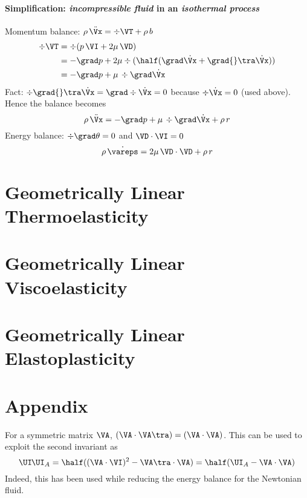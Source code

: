 \documentclass[a5paper,twosided,11pt,DIV=15,BCOR=0mm]{scrbook}
\newcommand{\veps}{\vareps}
\newcommand{\rtwo}{\UI\hspace{-0.07em}\UI}
\begin{document}
\subsubsection{Simplification: \emph{incompressible fluid} in an
  \emph{isothermal process}}
Momentum balance: $\rho\,\ddot{\Vx} = \div\VT + \rho\,b$
\begin{align}
\nonumber  \div\VT &= \div(p\,\VI + 2\mu\,\VD) \\
  &= -\grad p + 2\mu\div(\half(\grad\dot{\Vx}+\grad{}\tra\dot{\Vx}))\\
  &= -\grad p + \mu\,\div\grad\dot{\Vx}
\end{align}
Fact: $\div\grad{}\tra\dot{\Vx}=\grad\div\dot{\Vx} = 0$ because
$\div\dot{\Vx}=0$ (used above). Hence the balance becomes
%
\begin{equation}
  \rho\,\ddot{\Vx} = -\grad p + \mu\,\div\grad\dot{\Vx} + \rho\,r
\end{equation}
Energy balance: $\div\grad\theta=0$ and $\VD\cdot\VI=0$
\begin{equation}
  \rho\,\dot{\veps} = 2\mu\,\VD\cdot\VD+\rho\,r
\end{equation}
\chapter{Geometrically Linear Thermoelasticity}
%
%
\chapter{Geometrically Linear Viscoelasticity}
%
\chapter{Geometrically Linear Elastoplasticity}
%
\chapter{Appendix}
For a symmetric matrix $\VA$, $(\VA\cdot\VA\tra)=(\VA\cdot\VA)$. This can be used to
exploit the second invariant as
\begin{equation}
  \rtwo_A=\half((\VA\cdot\VI)^2-\VA\tra\cdot\VA) = \half(\UI_A-\VA\cdot\VA)
\end{equation}
Indeed, this has been used while reducing the energy balance for the Newtonian fluid.
%
%
\end{document}
